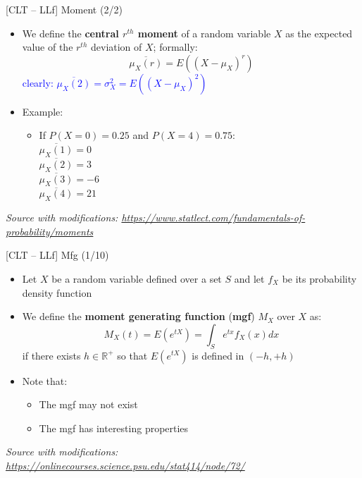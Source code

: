 \documentclass{beamer}
\begin{document}
\begin{frame}
{\centerline{[CLT -- LLf] Moment (2/2)}}


\begin{itemize}
\item We define the \textbf{central $r^{th}$ moment} of a random variable $X$ as the expected value of the $r^{th}$ deviation of $X$; formally:
$$ \overline{\mu_X(r)} = E((X-\mu_X)^r)$$
\textcolor{blue}{clearly: $ \overline{\mu_X(2)} = \sigma_X^2 = E((X-\mu_X)^2)$}
\item Example:
\begin{itemize}
\item If $P(X=0) = 0.25$ and $P(X=4) = 0.75$:\\
$\overline{\mu_X(1)} = 0$\\
$\overline{\mu_X(2)} = 3$\\
$\overline{\mu_X(3)} = -6$\\
$\overline{\mu_X(4)} = 21$\\
\end{itemize}

\end{itemize}

\textit{\small
Source with modifications: \url{https://www.statlect.com/fundamentals-of-probability/moments}}
\end{frame}


\begin{frame}
{\centerline{[CLT -- LLf] Mfg (1/10)}}

\begin{itemize}
\item Let $X$ be a random variable defined over a set $S$ and let $f_X$ be its probability density function
\item We define the \textbf{moment generating function} (\textbf{mgf}) $M_X$ over $X$ as:
$$M_X(t) = E(e^{tX}) = \int_S e^{tx}f_X(x)dx$$
if there exists $h \in \mathbb{R^+}$ so that $E(e^{tX})$ is defined in $(-h,+h)$
\item Note that:
\begin{itemize}
\item The mgf may not exist 
\item The mgf has interesting properties
\end{itemize}

\end{itemize}

\textit{\small
Source with modifications: \url{https://onlinecourses.science.psu.edu/stat414/node/72/}}
\end{frame}
\end{document}
